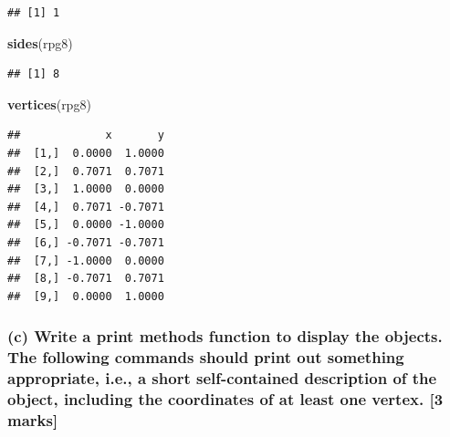 \documentclass[]{article}
\newenvironment{Shaded}{\begin{snugshade}}{\end{snugshade}}
\newcommand{\KeywordTok}[1]{\textcolor[rgb]{0.13,0.29,0.53}{\textbf{#1}}}
\newcommand{\NormalTok}[1]{#1}
\begin{document}
\begin{verbatim}
## [1] 1
\end{verbatim}

\begin{Shaded}
\begin{Highlighting}[]
\KeywordTok{sides}\NormalTok{(rpg8)}
\end{Highlighting}
\end{Shaded}

\begin{verbatim}
## [1] 8
\end{verbatim}

\begin{Shaded}
\begin{Highlighting}[]
\KeywordTok{vertices}\NormalTok{(rpg8)}
\end{Highlighting}
\end{Shaded}

\begin{verbatim}
##             x       y
##  [1,]  0.0000  1.0000
##  [2,]  0.7071  0.7071
##  [3,]  1.0000  0.0000
##  [4,]  0.7071 -0.7071
##  [5,]  0.0000 -1.0000
##  [6,] -0.7071 -0.7071
##  [7,] -1.0000  0.0000
##  [8,] -0.7071  0.7071
##  [9,]  0.0000  1.0000
\end{verbatim}

\subsubsection{(c) Write a print methods function to display the
objects. The following commands should print out something appropriate,
i.e., a short self-contained description of the object, including the
coordinates of at least one vertex. {[}3
marks{]}}\label{c-write-a-print-methods-function-to-display-the-objects.-the-following-commands-should-print-out-something-appropriate-i.e.-a-short-self-contained-description-of-the-object-including-the-coordinates-of-at-least-one-vertex.-3-marks}
\end{document}
